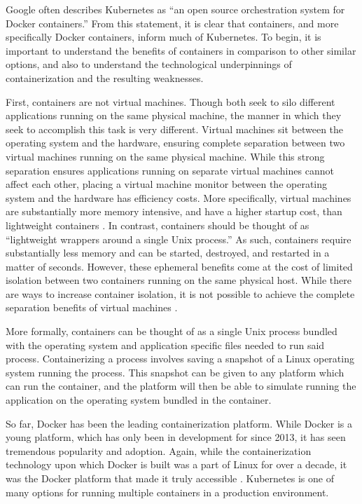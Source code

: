 Google often describes Kubernetes as ``an open source orchestration system for
Docker containers.''\cite{k8s-website} From this statement, it is clear that
containers, and more specifically Docker containers, inform much of Kubernetes.
To begin, it is important to understand the benefits of containers in comparison
to other similar options, and also to understand the technological underpinnings
of containerization and the resulting weaknesses.

First, containers are not virtual machines. Though both seek to silo different
applications running on the same physical machine, the manner in which they
seek to accomplish this task is very different. Virtual machines sit between the
operating system and the hardware, ensuring complete separation between two
virtual machines running on the same physical machine. While this strong
separation ensures applications running on separate virtual machines cannot
affect each other, placing a virtual machine monitor between the operating
system and the hardware has efficiency costs. More specifically, virtual
machines are substantially more memory intensive, and have a higher startup cost,
than lightweight containers \cite{distributed-systems-principles-and-paradigms}.
In contrast, containers should be thought of as ``lightweight wrappers around a
single Unix process.''\cite[pg. 15]{docker-up-and-running} As such, containers
require substantially less memory and can be started, destroyed, and restarted
in a matter of seconds. However, these ephemeral benefits come at the cost of
limited isolation between two containers running on the same physical host.
While there are ways to increase container isolation, it is not possible to
achieve the complete separation benefits of virtual
machines \cite{docker-up-and-running}.

More formally, containers can be thought of as a single Unix process bundled
with the operating system and application specific files needed to run said process.
Containerizing a process involves saving a snapshot of a Linux operating system
running the process. This snapshot can be given to any platform which can run
the container, and the platform will then be able to simulate running the
application on the operating system bundled in the container.

So far, Docker has been the leading containerization platform. While Docker is a
young platform, which has only been in development for since 2013, it has seen
tremendous popularity and adoption. Again, while the containerization technology
upon which Docker is built was a part of Linux for over a decade, it was the
Docker platform that made it truly accessible \cite{docker-up-and-running}.
Kubernetes is one of many options for running multiple containers in a
production environment.
